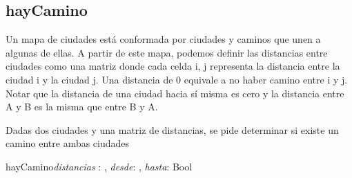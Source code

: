 \documentclass[10pt,a4paper]{article}
\begin{document}
\subsection{hayCamino}

 Un mapa de ciudades está conformada por ciudades y caminos que unen a algunas de ellas. A partir de este mapa, podemos definir las distancias entre ciudades como una matriz donde cada celda i, j representa la distancia entre la ciudad i y la ciudad j. Una distancia de 0 equivale a no haber camino entre i y j. Notar que la distancia de una ciudad hacia sí misma es cero y la distancia entre A y B es la misma que entre B y A.
 
 Dadas dos ciudades y una matriz de distancias, se pide determinar si existe un camino entre ambas ciudades
 
 \vspace{2mm}

 
\begin{proc}{hayCamino}{\In \textit{distancias} : \TLista{\TLista{\ent}}, \In \textit{desde}: \ent, \In \textit{hasta}: \ent}{Bool}
\end{proc}



\end{document}
